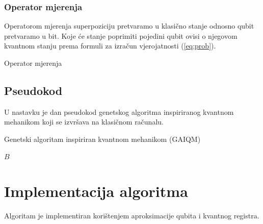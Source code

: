 \documentclass[times, utf8, zavrsni, numeric]{fer}
\begin{document}
\subsubsection{Operator mjerenja}
Operatorom mjerenja superpoziciju pretvaramo u klasično stanje odnosno qubit pretvaramo u bit. Koje će stanje poprimiti pojedini qubit ovisi o njegovom kvantnom stanju prema formuli za izračun vjerojatnosti (\ref{eq:prob}).
\begin{algorithm}
\caption{Operator mjerenja}
\label{algo:op_mjerenja}
\begin{algorithmic}
 
\ELSE
{}
\ENDIF
\end{algorithmic}
\end{algorithm}

\newpage

\subsection{Pseudokod}
U nastavku je dan pseudokod genetskog algoritma inspiriranog kvantnom mehanikom koji se izvršava na klasičnom računalu.

\begin{algorithm}
\caption{Genetski algoritam inspiriran kvantnom mehanikom (GAIQM)}
\label{algo:gaiqm}
\begin{algorithmic}
\ENDIF
{}
\ENDWHILE
\RETURN $B$
\end{algorithmic}
\end{algorithm}

\newpage

\section{Implementacija algoritma}
Algoritam je implementiran korištenjem aproksimacije qubita i kvantnog registra.
\end{document}

